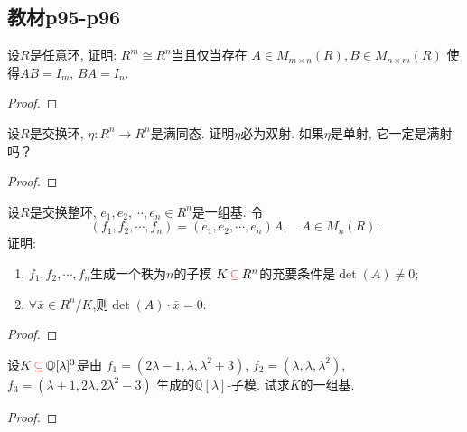 \subsection{教材p95-p96}

\begin{problem}
    设$R$是任意环, 证明: $R^m \cong R^n$当且仅当存在
$A \in M_{m \times n}(R), B \in M_{n \times m}(R)$
使得$AB = I_m$, $BA = I_{n}$.
\end{problem}

\begin{proof}
    
\end{proof}

\begin{problem}
    设$R$是交换环, $\eta:R^n \to R^n$是满同态.
证明$\eta$必为双射. 如果$\eta$是单射, 它一定是满射吗？
\end{problem}

\begin{proof}
    
\end{proof}

\begin{problem}
    设$R$是交换整环, $e_1, e_2, \cdots, e_n \in R^n$是一组基.
令
\[
    (f_1, f_2, \cdots, f_n) = (e_1, e_2, \cdots, e_n)A,\quad A \in M_n(R).
\]
证明:
\begin{enumerate}[(1)]
    \item $f_1, f_2, \cdots, f_n$生成一个秩为$n$的子模
$K \,\textcolor{red}{\subseteq}\, R^n$的充要条件是$\det(A) \neq 0$;
    \item $\forall \bar{x} \in R^{n}/K$,则$\det(A) \cdot \bar{x} = 0$.
\end{enumerate}
\end{problem}

\begin{proof}
    
\end{proof}

\begin{problem}
    设$K \,\textcolor{red}{\subseteq}\, \mathbb{Q}[\lambda]^3$是由
$f_1 = (2\lambda - 1, \lambda, \lambda^2 + 3)$,
$f_2 = (\lambda, \lambda, \lambda^2)$,
$f_3 = (\lambda + 1, 2\lambda, 2\lambda^2 - 3)$
生成的$\mathbb{Q}[\lambda]$-子模. 试求$K$的一组基.
\end{problem}

\begin{proof}
    
\end{proof}

